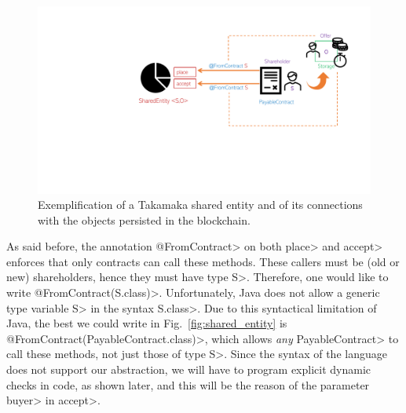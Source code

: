 \begin{figure}[ht]
\centering
\includegraphics[width=.9\linewidth]{figures/shared_entity}
\caption{Exemplification of a Takamaka shared entity and of its connections with the objects persisted in the blockchain.}
\label{figure.shared_entity}
\end{figure}

As said before, the annotation \<@FromContract> on both \<place> and \<accept> enforces that only
contracts can call these methods.
These callers must be (old or new) shareholders,
hence they must have type \<S>. Therefore, one would like to write
\<@FromContract(S.class)>. Unfortunately, Java does not allow a generic type variable \<S>
in the syntax \<S.class>. Due to this syntactical limitation of Java,
the best we could write in Fig.~\ref{fig:shared_entity} is \<@FromContract(PayableContract.class)>,
which allows \emph{any} \<PayableContract> to call these methods, not just those of type \<S>.
Since the syntax of the language does not support our abstraction, we will have to
program explicit dynamic checks in code, as shown later, and this will be the reason of the
parameter \<buyer> in \<accept>.



